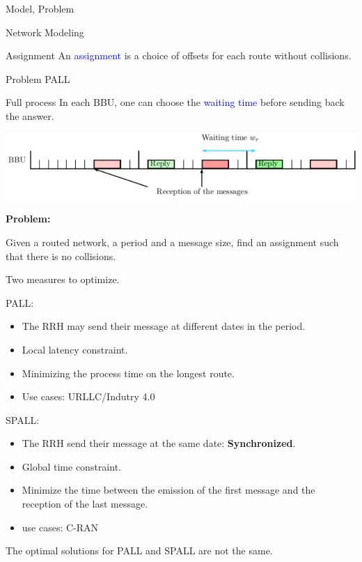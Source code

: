 \documentclass[10 pt]{beamer}
\begin{document}
\begin{section}{Model, Problem}
\begin{subsection}{Network Modeling}
\begin{frame}{Assignment }
An \textcolor{blue}{assignment} is a choice of offsets for each route without collisions.
\end{frame}
\end{subsection}



\begin{subsection}{Problem PALL}
\begin{frame}{Full process}
In each BBU, one can choose the \textcolor{blue}{waiting time} before sending back the answer.\\

\begin{center}
  \includegraphics[scale=0.7]{BBU}\\
 \end{center} 

\textbf{Problem:}

Given a routed network, a period and a message size, find an assignment such that there is no collisions.
\end {frame}
\begin{frame}
Two measures to optimize.
 \begin{multicols}{2}
PALL:
\begin{itemize}
\item The RRH may send their message at different dates in the period.
\item Local latency constraint.
\item Minimizing the process time on the longest route.
\item Use cases: URLLC/Indutry 4.0
\end{itemize}
\vspace{0.5cm}
SPALL:
\begin{itemize}
\item The RRH send their message at the same date: \textbf{Synchronized}.
\item Global time constraint.
\item Minimize the time between the emission of the first message and the reception of the last message.
\item use cases: C-RAN
\end{itemize}
\end{multicols}

The optimal solutions for PALL and SPALL are not the same.
\end{frame}
\end{subsection}


\end{section}
\end{document}
